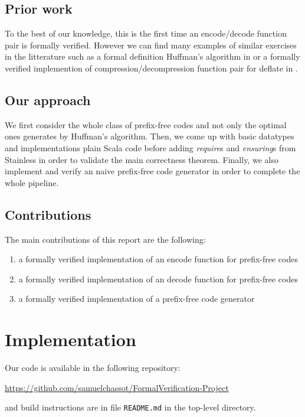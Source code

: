 \documentclass[a4paper,UKenglish,cleveref, autoref, thm-restate]{lipics-v2021}
\begin{document}
\subsection*{Prior work}

To the best of our knowledge, this is the first time an encode/decode function pair is formally verified.
However we can find many examples of similar exercises in the litterature such as a formal definition Huffman's algorithm in \cite{formal} or a formally verified implemention of compression/decompression function pair for deflate in \cite{deflate}.

\subsection*{Our approach} %

We first consider the whole class of prefix-free codes and not only the optimal ones generates by Huffman's algorithm.
Then, we come up with basic datatypes and implementations plain Scala code before adding  \emph{require}s and \emph{ensuring}s from Stainless in order to validate the main correctness theorem.
Finally, we also implement and verify an naive prefix-free code generator in order to complete the whole pipeline.

\subsection*{Contributions} %

The main contributions of this report are the following:
\begin{enumerate}
    \item a formally verified implementation of an encode function for prefix-free codes
    \item a formally verified implementation of an decode function for prefix-free codes
    \item a formally verified implementation of a prefix-free code generator
\end{enumerate}

\section{Implementation}

Our code is available in the following repository:
\begin{center}
    \url{https://github.com/samuelchassot/FormalVerification-Project}
\end{center}
and build instructions are in file \verb|README.md| in the top-level directory.
\end{document}
